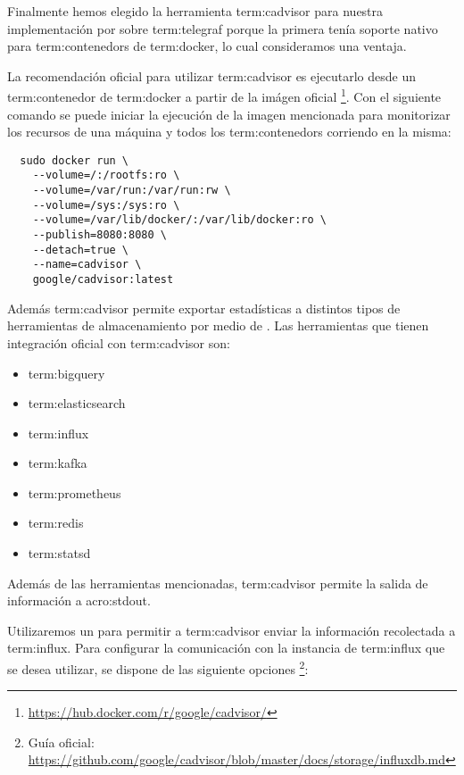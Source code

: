 Finalmente hemos elegido la herramienta \gls{term:cadvisor} para nuestra
implementación por sobre \gls{term:telegraf} porque la primera tenía soporte nativo para
\glspl{term:contenedor} de \gls{term:docker}, lo cual consideramos una ventaja.

La recomendación oficial para utilizar \gls{term:cadvisor} es ejecutarlo desde
un \gls{term:contenedor} de \gls{term:docker} a partir de la imágen oficial
\footnote{\url{https://hub.docker.com/r/google/cadvisor/}}. Con el siguiente
comando se puede iniciar la ejecución de la imagen mencionada para monitorizar
los recursos de una máquina y todos los \glspl{term:contenedor} corriendo en la
misma:

\begin{lstlisting}
  sudo docker run \
    --volume=/:/rootfs:ro \
    --volume=/var/run:/var/run:rw \
    --volume=/sys:/sys:ro \
    --volume=/var/lib/docker/:/var/lib/docker:ro \
    --publish=8080:8080 \
    --detach=true \
    --name=cadvisor \
    google/cadvisor:latest
\end{lstlisting}


Además \gls{term:cadvisor} permite exportar estadísticas a distintos tipos de
herramientas de almacenamiento por medio de . Las herramientas que
tienen integración oficial con \gls{term:cadvisor} son:

\begin{itemize}
  \item \gls{term:bigquery}
  \item \gls{term:elasticsearch}
  \item \gls{term:influx}
  \item \gls{term:kafka}
  \item \gls{term:prometheus}
  \item \gls{term:redis}
  \item \gls{term:statsd}
\end{itemize}

Además de las herramientas mencionadas, \gls{term:cadvisor} permite la salida
de información a \gls{acro:stdout}.

Utilizaremos un \eng{plugin} para permitir a \gls{term:cadvisor} enviar la
información recolectada a \gls{term:influx}. Para configurar la comunicación
con la instancia de \gls{term:influx} que se desea utilizar, se dispone de las
siguiente opciones
\footnote{Guía oficial: \url{https://github.com/google/cadvisor/blob/master/docs/storage/influxdb.md}}:

